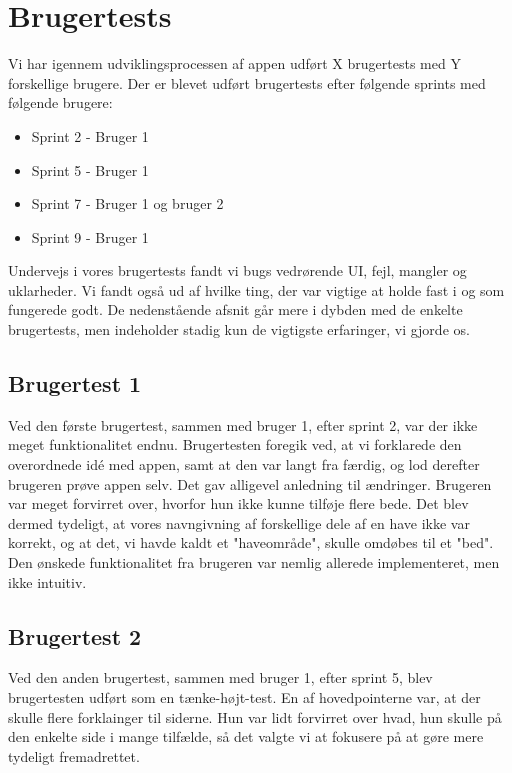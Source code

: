 \section{Brugertests}
Vi har igennem udviklingsprocessen af appen udført X brugertests med Y forskellige brugere. Der er blevet udført brugertests efter følgende sprints med følgende brugere:
\begin{itemize}
    \item Sprint 2 - Bruger 1
    \item Sprint 5 - Bruger 1
    \item Sprint 7 - Bruger 1 og bruger 2
    \item Sprint 9 - Bruger 1
\end{itemize}

Undervejs i vores brugertests fandt vi bugs vedrørende UI, fejl, mangler og uklarheder. Vi fandt også ud af hvilke ting, der var vigtige at holde fast i og som fungerede godt. De nedenstående afsnit går mere i dybden med de enkelte brugertests, men indeholder stadig kun de vigtigste erfaringer, vi gjorde os.

\subsection{Brugertest 1}
Ved den første brugertest, sammen med bruger 1, efter sprint 2, var der ikke meget funktionalitet endnu. Brugertesten foregik ved, at vi forklarede den overordnede idé med appen, samt at den var langt fra færdig, og lod derefter brugeren prøve appen selv. Det gav alligevel anledning til ændringer. Brugeren var meget forvirret over, hvorfor hun ikke kunne tilføje flere bede. Det blev dermed tydeligt, at vores navngivning af forskellige dele af en have ikke var korrekt, og at det, vi havde kaldt et "haveområde", skulle omdøbes til et "bed". Den ønskede funktionalitet fra brugeren var nemlig allerede implementeret, men ikke intuitiv.

\subsection{Brugertest 2}

Ved den anden brugertest, sammen med bruger 1, efter sprint 5, blev brugertesten udført som en tænke-højt-test. En af hovedpointerne var, at der skulle flere forklainger til siderne. Hun var lidt forvirret over hvad, hun skulle på den enkelte side i mange tilfælde, så det valgte vi at fokusere på at gøre mere tydeligt fremadrettet.


